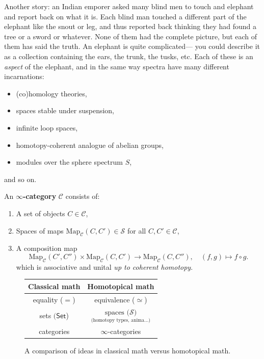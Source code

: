 Another story: an Indian emporer asked many blind men to touch and elephant and report back on what it is. Each blind man touched a different part of the elephant like the snout or leg, and thus reported back thinking they had found a tree or a sword or whatever. None of them had the complete picture, but each of them has said the truth. An elephant is quite complicated--- you could describe it as a collection containing the ears, the trunk, the tusks, etc. Each of these is an \textit{aspect} of the elephant, and in the same way spectra have many different incarnations:
\begin{itemize}
\setlength\itemsep{-.2em}
    \item (co)homology theories,
    \item spaces stable under suspension,
    \item infinite loop spaces,
    \item homotopy-coherent analogue of abelian groups,
    \item modules over the sphere spectrum $S$,
\end{itemize}
and so on.

\begin{definition}[]
    An $\mathbf \infty$\textbf{-category} $\mathcal{C} $ consists of:
    \begin{enumerate}[label=(\roman*)]
    \setlength\itemsep{-.2em}
        \item A set of objects $C \in \mathcal{C} $,
        \item Spaces of maps $\mathrm{Map}_{\mathcal{C} }(C,C') \in \mathcal{S} $ for all $C,C' \in \mathcal{C} $,
        \item A composition map \[
                \mathrm{Map}_{\mathcal{C} }(C',C'')\times \mathrm{Map}_{\mathcal{C} }(C,C') \to \mathrm{Map}_{\mathcal{C} }(C,C''),\quad (f,g) \mapsto f \circ g.
        \] which is associative and unital \emph{up to coherent homotopy}.
    \end{enumerate}
\end{definition}

\begin{figure}
\centering
\begin{tabular}{|| c | c ||} 
    \hline
    Classical math & Homotopical math \\
    \hline\hline
    equality ($=$) & equivalence ($\simeq$)\\ \hline
    sets $(\mathsf{Set} $) & $\underset{\text{(homotopy types, anima...)}}{\text{spaces (}\mathcal{S} \text{)}} $\\ \hline
    categories & $\infty$-categories \\ \hline
\end{tabular}
\label{comparison}
\caption{A comparison of ideas in classical math versus homotopical math.} 
\end{figure}


